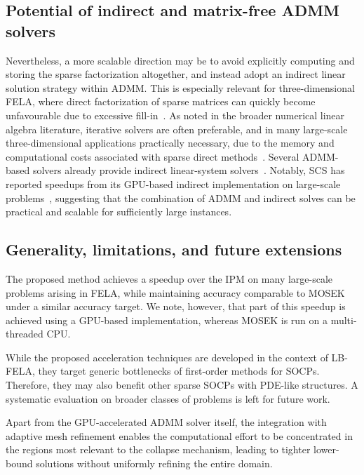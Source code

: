 \subsection{Potential of indirect and matrix-free ADMM solvers}


Nevertheless, a more scalable direction may be to avoid explicitly computing and storing the sparse factorization altogether, and instead adopt an indirect linear solution strategy within ADMM. This is especially relevant for three-dimensional FELA, where direct factorization of sparse matrices can quickly become unfavourable due to excessive fill-in~\cite{Shewchuk_CG}. As noted in the broader numerical linear algebra literature, iterative solvers are often preferable, and in many large-scale three-dimensional applications practically necessary, due to the memory and computational costs associated with sparse direct methods~\cite{Saad_book}. Several ADMM-based solvers already provide indirect linear-system solvers~\cite{SCS, OSQP, COSMO, GeNIOS}. Notably, SCS has reported speedups from its GPU-based indirect implementation on large-scale problems~\cite{SCS}, suggesting that the combination of ADMM and indirect solves can be practical and scalable for sufficiently large instances.


\subsection{Generality, limitations, and future extensions}

The proposed method achieves a speedup over the IPM on many large-scale problems arising in FELA, while maintaining accuracy comparable to MOSEK under a similar accuracy target. We note, however, that part of this speedup is achieved using a GPU-based implementation, whereas MOSEK is run on a multi-threaded CPU. 

While the proposed acceleration techniques are developed in the context of LB-FELA, they target generic bottlenecks of first-order methods for SOCPs. Therefore, they may also benefit other sparse SOCPs with PDE-like structures. A systematic evaluation on broader classes of problems is left for future work.


Apart from the GPU-accelerated ADMM solver itself, the integration with adaptive mesh refinement enables the computational effort to be concentrated in the regions most relevant to the collapse mechanism, leading to tighter lower-bound solutions without uniformly refining the entire domain.

